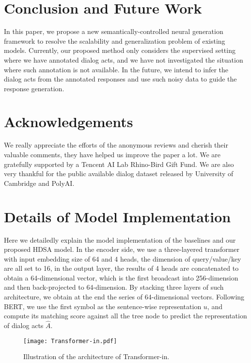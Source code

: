 \documentclass[11pt,a4paper]{article}
\begin{document}
\section{Conclusion and Future Work}
In this paper, we propose a new semantically-controlled neural generation framework to resolve the scalability and generalization problem of existing models. Currently, our proposed method only considers the supervised setting where we have annotated dialog acts, and we have not investigated the situation where such annotation is not available. In the future, we intend to infer the dialog acts from the annotated responses and use such noisy data to guide the response generation. 


\section{Acknowledgements}
We really appreciate the efforts of the anonymous reviews and cherish their valuable comments, they have helped us improve the paper a lot. We are gratefully supported by a Tencent AI Lab Rhino-Bird Gift Fund. We are also very thankful for the public available dialog dataset released by University of Cambridge and PolyAI.





\clearpage
\appendix
\section{Details of Model Implementation}
Here we detailedly explain the model implementation of the baselines and our proposed HDSA model. In the encoder side, we use a three-layered transformer with input embedding size of 64 and 4 heads, the dimension of query/value/key are all set to 16, in the output layer, the results of 4 heads are concatenated to obtain a 64-dimensional vector, which is the first broadcast into 256-dimension and then back-projected to 64-dimension. By stacking three layers of such architecture, we obtain at the end the series of 64-dimensional vectors. Following BERT, we use the first symbol as the sentence-wise representation $u$, and compute its matching score against all the tree node to predict the representation of dialog acts $\hat{A}$. 
\begin{figure}[thb]
    \begin{center}
    \texttt{[image: Transformer-in.pdf]}
    \end{center}
    \caption{Illustration of the architecture of Transformer-in. }
    \label{fig:transformer-in}
\end{figure}
\end{document}
